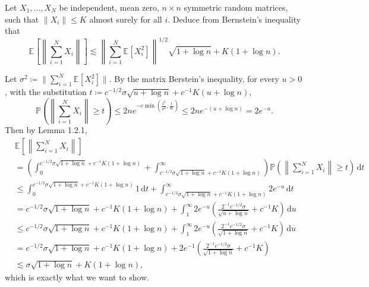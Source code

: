 \begin{problem*}[Exercise 5.4.11]\label{ex5.4.11}
	Let \(X_1, \dots , X_N\) be independent, mean zero, \(n \times n\) symmetric random matrices, such that \(\lVert X_i \rVert \leq K\) almost surely for all \(i\). Deduce from Bernstein's inequality that
	\[
		\mathbb{E}_{}\left[\left\lVert \sum_{i=1}^{N} X_i \right\rVert \right]
		\lesssim \left\lVert \sum_{i=1}^{N} \mathbb{E}_{}[X_i^2] \right\rVert ^{1 / 2} \sqrt{1 + \log n} + K(1 + \log n).
	\]
\end{problem*}
\begin{answer}
	Let \(\sigma^2 \coloneqq \lVert {\sum_{i=1}^N \mathbb{E}_{}[X_i^2] } \rVert \). By the matrix Berstein's inequality, for every \(u > 0\), with the substitution \(t \coloneqq c^{-1 / 2} \sigma \sqrt{u + \log n} + c^{-1} K (u+\log n)\),
	\[
		\mathbb{P} \left(\left\lVert {\sum_{i=1}^{N} X_i} \right\rVert \geq t \right)
		\leq 2 n e^{-c\min\left( \frac{t^2}{\sigma^2}, \frac{t}{K} \right)}
		\leq 2 n e^{-(u+\log n)}
		= 2 e^{-u}.
	\]
	Then by Lemma 1.2.1,
	\[
		\begin{split}
			 & \mathbb{E}_{}\left[\left\lVert \sum_{i=1}^{N} X_i \right\rVert \right]                                                                                                                                                                   \\
			 & = \left( \int_{0}^{c^{-1 / 2}\sigma\sqrt{1+\log n}+c^{-1}K(1+\log n)}+\int_{c^{-1 / 2}\sigma\sqrt{1+\log n}+c^{-1}K(1+\log n)}^{\infty} \right) \mathbb{P} \left( \left\lVert \sum_{i=1}^NX_i \right\rVert \geq t \right) \,\mathrm{d} t \\
			 & \leq \int_{0}^{c^{-1 / 2}\sigma \sqrt{1+\log n}+c^{-1}K(1+\log n)} 1 \,\mathrm{d} t + \int_{c^{-1 / 2}\sigma\sqrt{1+\log n}+c^{-1}K(1+\log n)}^{\infty} 2 e^{-u} \,\mathrm{d} t                                                          \\
			 & = c^{-1 / 2}\sigma\sqrt{1+\log n}+c^{-1}K(1+\log n) + \int_{1}^{\infty} 2 e^{-u} \left(\frac{2^{-1}c^{-1 / 2}\sigma}{\sqrt{u+\log n}}+c^{-1}K \right)\,\mathrm{d} u                                                                      \\
			 & \leq c^{-1 / 2}\sigma\sqrt{1+\log n} + c^{-1}K(1+\log n) + \int_{1}^{\infty} 2 e^{-u} \left(\frac{2^{-1}c^{-1 / 2}\sigma}{\sqrt{1+\log n}}+c^{-1}K\right) \,\mathrm{d} u                                                                 \\
			 & = c^{-1 / 2}\sigma\sqrt{1+\log n} + c^{-1}K(1+\log n)+2e^{-1}\left(\frac{2^{-1}c^{-1 / 2}\sigma}{\sqrt{1+\log n}}+c^{-1}K\right)                                                                                                         \\
			 & \lesssim \sigma\sqrt{1+\log n}+K(1+\log n),
		\end{split}
	\]
	which is exactly what we want to show.
\end{answer}

